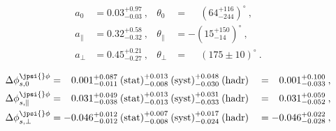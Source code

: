 

%



\begin{align}
a_0 & = 0.03^{+0.97}_{-0.03}\:, & \theta_0 & = \phantom{-}\left(64^{+116}_{-244}\right)^{\circ}\:,\\
%
a_\parallel & = 0.32^{+0.58}_{-0.32}\:, & \theta_\parallel & = -\left(15^{+150}_{-14}\right)^{\circ}\:,\\
%
a_\perp & = 0.45^{+0.21}_{-0.27}\:, & \theta_\perp & = \phantom{-}\left(175 \pm 10\right)^{\circ}\:.
\end{align}



\begin{alignat}{2}
\Delta\phi^{\jpsi{}\phi}_{s,0} & =
\phantom{-}0.001^{+0.087}_{-0.011}\:\text{(stat)}^{+0.013}_{-0.008}\:\text{(syst)}^{+0.048}_{-0.030}\:(\text{hadr})
&& = \phantom{-}0.001^{+0.100}_{-0.033}\:,\\
%
\Delta\phi^{\jpsi{}\phi}_{s,\parallel} & =
\phantom{-}0.031^{+0.049}_{-0.038}\:\text{(stat)}^{+0.013}_{-0.013}\:\text{(syst)}^{+0.031}_{-0.033}\:(\text{hadr})
&& = \phantom{-}0.031^{+0.059}_{-0.052}\:,\\
%
\Delta\phi^{\jpsi{}\phi}_{s,\perp} & =
-0.046^{+0.012}_{-0.012}\:\text{(stat)}^{+0.007}_{-0.008}\:\text{(syst)}^{+0.017}_{-0.024}\:(\text{hadr})
&& = -0.046^{+0.022}_{-0.028}\:,
\end{alignat}


